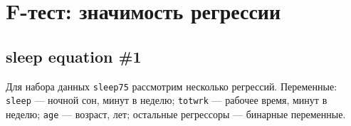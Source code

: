 \documentclass[
  russian,
]{article}
\begin{document}
\section{F-тест: значимость
регрессии}\label{f-ux442ux435ux441ux442-ux437ux43dux430ux447ux438ux43cux43eux441ux442ux44c-ux440ux435ux433ux440ux435ux441ux441ux438ux438}

\subsection{sleep equation \#1}\label{sleep-equation-1}

Для набора данных \texttt{sleep75} рассмотрим несколько регрессий.
Переменные: \texttt{sleep} --- ночной сон, минут в неделю;
\texttt{totwrk} --- рабочее время, минут в неделю; \texttt{age} ---
возраст, лет; остальные регрессоры --- бинарные переменные.
\end{document}
